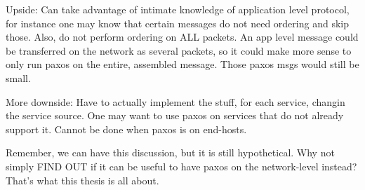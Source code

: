 Upside: Can take advantage of intimate knowledge of application level
protocol, for instance one may know that certain messages do not need
ordering and skip those. Also, do not perform ordering on ALL packets.
An app level message could be transferred on the network as several packets,
so it could make more sense to only run paxos on the entire, assembled
message. Those paxos msgs would still be small.

More downside: Have to actually implement the stuff, for each service,
changin the service source. One may want to use paxos on services that
do not already support it. Cannot be done when paxos is on end-hosts.

Remember, we can have this discussion, but it is still hypothetical.
Why not simply FIND OUT if it can be useful to have paxos on the
network-level instead? That's what this thesis is all about.


